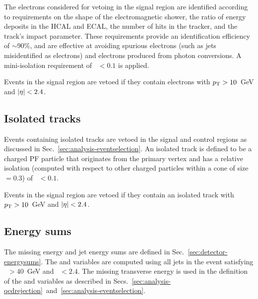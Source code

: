 The electrons considered for vetoing in the signal region are identified 
according to requirements on the shape of the electromagnetic shower, the ratio 
of energy deposits in the HCAL and ECAL, the number of hits in the tracker, and 
the track's impact parameter.  %
These requirements provide an identification efficiency of $\sim$90\%, and are 
effective at %
avoiding spurious electrons (such as jets misidentified as 
electrons) and electrons produced from photon conversions. %
A mini-isolation requirement of \miniiso~$<0.1$ is applied.

Events in the signal region are vetoed if they contain 
electrons with ${p_{\text T}}>10$~GeV and $|\eta|<2.4$.

\subsection*{Isolated tracks}
Events containing isolated tracks are vetoed in the signal and control regions 
as discussed in Sec.~\ref{sec:analysis-eventselection}. An isolated track is 
defined to be a 
charged PF particle that originates from the primary vertex and has a relative 
isolation (computed with respect to other charged particles within a cone 
of size \DR$=0.3$) of \reliso~$ < 0.1$.

Events in the signal region are vetoed if they contain 
an isolated track with {${p_{\text T}}>10$~GeV} and {$|\eta|<2.4$}.

\subsection*{Energy sums}
The missing energy and jet energy sums are defined in 
Sec.~\ref{sec:detector-energysums}. 
The \scalht and \MHT variables are computed using all jets in the event 
satisfying \pt~$>40$~GeV and \etaabs~$<2.4$.
The missing transverse energy \met is used in the definition of the \mt and 
\mhtmet variables as described in 
Secs.~\ref{sec:analysis-qcdrejection}~and~\ref{sec:analysis-eventselection}.


